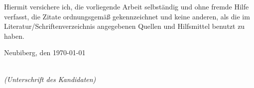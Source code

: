 \newpage

\thispagestyle{empty}

\begin{large}

    \vspace*{2cm}

    \noindent
    Hiermit versichere ich, die vorliegende Arbeit selbständig und ohne fremde Hilfe verfasst, die Zitate ordnungsgemäß gekennzeichnet und keine anderen, als die im Literatur/Schriftenverzeichnis angegebenen Quellen und Hilfsmittel benutzt zu haben.\\[1em]


    \vspace{2cm}

    \noindent
    Neubiberg, den \today

    \vspace{3cm}

    \hspace*{7cm}%
    \dotfill\\
    \hspace*{8.5cm}%
    \textit{(Unterschrift des Kandidaten)}

\end{large}
